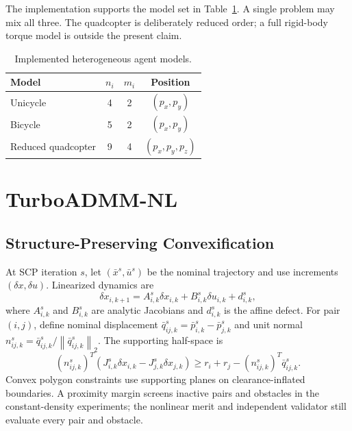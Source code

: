 \documentclass[letterpaper,10pt,conference]{ieeeconf}
\newcommand{\norm}[1]{\left\lVert #1\right\rVert}
\begin{document}
The implementation supports the model set in Table~\ref{tab:models}. A single
problem may mix all three. The quadcopter is deliberately reduced order; a
full rigid-body torque model is outside the present claim.

\begin{table}[t]
\caption{Implemented heterogeneous agent models.}
\label{tab:models}
\centering
\begin{tabular}{lccc}
\toprule
Model & $n_i$ & $m_i$ & Position \\
\midrule
Unicycle & 4 & 2 & $(p_x,p_y)$ \\
Bicycle & 5 & 2 & $(p_x,p_y)$ \\
Reduced quadcopter & 9 & 4 & $(p_x,p_y,p_z)$ \\
\bottomrule
\end{tabular}
\end{table}

\section{TurboADMM-NL}
\label{sec:method}

\subsection{Structure-Preserving Convexification}
At SCP iteration $s$, let $(\bar x^s,\bar u^s)$ be the nominal trajectory and
use increments $(\delta x,\delta u)$. Linearized dynamics are
\begin{equation}
 \delta x_{i,k+1}=A^s_{i,k}\delta x_{i,k}
 +B^s_{i,k}\delta u_{i,k}+d^s_{i,k},
\label{eq:linear-dynamics}
\end{equation}
where $A^s_{i,k}$ and $B^s_{i,k}$ are analytic Jacobians and $d^s_{i,k}$ is
the affine defect. For pair $(i,j)$, define nominal displacement
$\bar q^s_{ij,k}=\bar p^s_{i,k}-\bar p^s_{j,k}$ and unit normal
$n^s_{ij,k}=\bar q^s_{ij,k}/\norm{\bar q^s_{ij,k}}_2$. The supporting
half-space is
\begin{equation}
 (n^s_{ij,k})^T\left(J^s_{i,k}\delta x_{i,k}
 -J^s_{j,k}\delta x_{j,k}\right)
 \ge r_i+r_j-(n^s_{ij,k})^T\bar q^s_{ij,k}.
\label{eq:pair-halfspace}
\end{equation}
Convex polygon constraints use supporting planes on clearance-inflated
boundaries. A proximity margin screens inactive pairs and obstacles in the
constant-density experiments; the nonlinear merit and independent validator
still evaluate every pair and obstacle.
\end{document}
